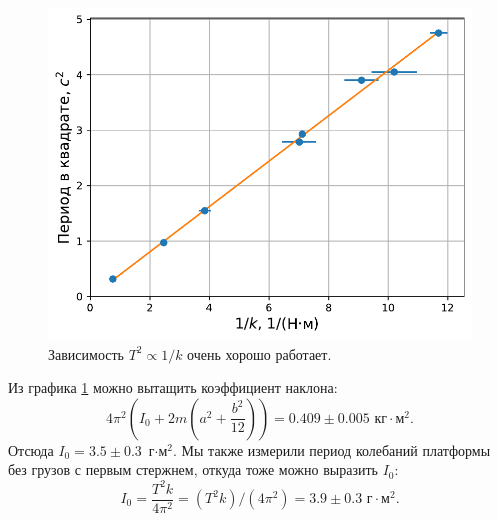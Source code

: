 \documentclass[a4paper, 12pt]{article}
\begin{document}
\begin{figure}[h]
\caption{Зависимость $T^2 \propto 1/k$ очень хорошо работает.}
\begin{center}
\includegraphics[width=0.8\linewidth]{periods_vs_tors_coefs_plot.pdf}
\end{center}
\label{fig:tk}
\end{figure}

Из графика \ref{fig:tk} можно вытащить коэффициент наклона:
\[
4 \pi^2 \left(I_0 + 2m \left( a^2 + \frac{b^2}{12} \right)\right) = 0.409 \pm 0.005 \text{ кг$\cdot$м$^2$}
.\]
Отсюда $I_0 = 3.5 \pm 0.3$~г$\cdot$м$^2$.
Мы также измерили период колебаний платформы без грузов с первым стержнем, откуда тоже можно выразить $I_0$:
\[ I_0 = \frac{T^2 k}{4 \pi^2} = (T^2 k)/(4 \pi^2) = 3.9 \pm 0.3 \text{ г$\cdot$м$^2$} .\]


\end{document}
